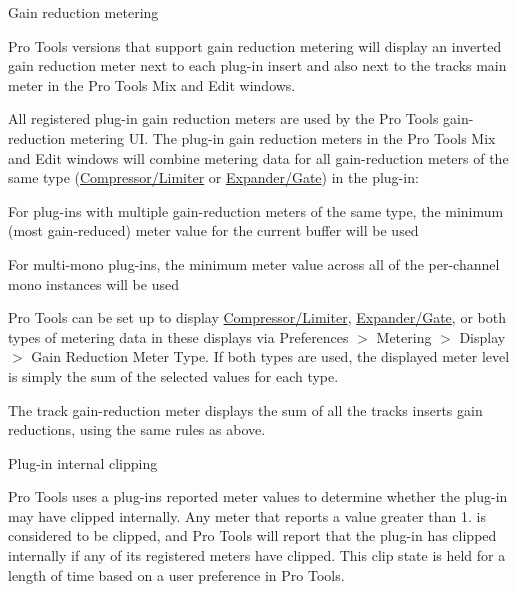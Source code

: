 \begin{DoxyItemize}
\item Gain reduction metering 

Pro Tools versions that support gain reduction metering will display an inverted gain reduction meter next to each plug-\/in insert and also next to the track\textquotesingle{}s main meter in the Pro Tools Mix and Edit windows.

All registered plug-\/in gain reduction meters are used by the Pro Tools gain-\/reduction metering U\+I. The plug-\/in gain reduction meters in the Pro Tools Mix and Edit windows will combine metering data for all gain-\/reduction meters of the same type (\hyperlink{a00206_a590815545eaf0d3be0bb8f656fe2a761af93404c1998a39f398adbb788355248f}{Compressor/\+Limiter} or \hyperlink{a00206_a590815545eaf0d3be0bb8f656fe2a761a58188550947e94f506dc0e43fe7cf302}{Expander/\+Gate}) in the plug-\/in\+:


\begin{DoxyItemize}
\item For plug-\/ins with multiple gain-\/reduction meters of the same type, the minimum (most gain-\/reduced) meter value for the current buffer will be used  
\item For multi-\/mono plug-\/ins, the minimum meter value across all of the per-\/channel mono instances will be used  
\end{DoxyItemize}

Pro Tools can be set up to display \hyperlink{a00206_a590815545eaf0d3be0bb8f656fe2a761af93404c1998a39f398adbb788355248f}{Compressor/\+Limiter}, \hyperlink{a00206_a590815545eaf0d3be0bb8f656fe2a761a58188550947e94f506dc0e43fe7cf302}{Expander/\+Gate}, or both types of metering data in these displays via Preferences $>$ Metering $>$ Display $>$ Gain Reduction Meter Type. If both types are used, the displayed meter level is simply the sum of the selected values for each type.

The track gain-\/reduction meter displays the sum of all the track\textquotesingle{}s inserts\textquotesingle{} gain reductions, using the same rules as above.




\item Plug-\/in internal clipping 

Pro Tools uses a plug-\/in\textquotesingle{}s reported meter values to determine whether the plug-\/in may have clipped internally. Any meter that reports a value greater than 1. is considered to be clipped, and Pro Tools will report that the plug-\/in has clipped internally if any of its registered meters have clipped. This clip state is held for a length of time based on a user preference in Pro Tools.


\end{DoxyItemize}
